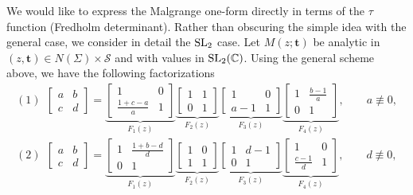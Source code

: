 \documentclass[pdftex]{sigma}
\numberwithin{equation}{section}
\def\C{{\mathbb C}}
\def \t{\mathbf t}
\begin{document}
We would like to express the Malgrange one-form directly in terms of the $\tau$ function (Fredholm determinant). Rather than obscuring the simple idea with the general case, we consider in detail the ${\rm SL}_2$ case. Let $M(z;\t)$ be analytic in $(z,\t)\in N(\Sigma)\times \mathcal S$ and with values in ${\rm SL}_2(\C)$.
Using the general scheme above, we have the following factorizations
\begin{gather}
 {(1)}\ \ \left[
\begin{matrix}
a & b\\
c &d
\end{matrix}
\right] =
\underbrace{\left[
\begin{matrix}
1 & 0\\
\frac {1+c-a} a & 1
\end{matrix}
\right]}_{F_1(z)}
\underbrace{
\left[
\begin{matrix}
1 & 1\\
0 & 1
\end{matrix}
\right]}_{F_2(z)}
\underbrace{
\left[
\begin{matrix}
1 & 0\\
a-1 & 1
\end{matrix}
\right]}_{F_3(z)}
\underbrace{
\left[
\begin{matrix}
1 & \frac {b-1} a\\
0 & 1
\end{matrix}
\right]}_{F_4(z)} ,\qquad a \not\equiv 0,\nonumber\\
{(2)}\ \ \left[
\begin{matrix}
a & b\\
c &d
\end{matrix}
\right] =
\underbrace{\left[
\begin{matrix}
1 & \frac {1+b-d} d\\
0 & 1
\end{matrix}
\right]}_{F_1(z)}
\underbrace{
\left[
\begin{matrix}
1 & 0\\
1 & 1
\end{matrix}
\right]}_{F_2(z)}
\underbrace{
\left[
\begin{matrix}
1 & d-1\\
0 & 1
\end{matrix}
\right]}_{F_3(z)}
\underbrace{
\left[
\begin{matrix}
1 & 0\\
\frac {c-1}d & 1
\end{matrix}
\right]}_{F_4(z)}, \qquad d \not\equiv 0,\nonumber\\

\end{gather}
\end{document}
